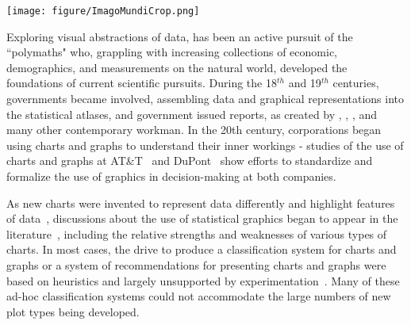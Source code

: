 \documentclass[letterpaper]{ar-1col}\usepackage[]{graphicx}\usepackage[]{color}
\begin{document}
\begin{minipage}{.35\textwidth}
\texttt{[image: figure/ImagoMundiCrop.png]}
\end{minipage}\hfill
\begin{minipage}{.6\textwidth}
\label{fig:imagomundi}
\end{minipage}
Exploring visual abstractions of data, has been an active pursuit of the ``polymaths" who, grappling with increasing collections of economic, demographics, and measurements on the natural world, developed the foundations of current scientific pursuits. During the 18$^{th}$ and 19$^{th}$ centuries, governments became involved, assembling data and graphical representations into the statistical atlases, and government issued reports, as created by \citet{Crome}, \citet{playfair1801statistical}, \citet{atlas}, and many other contemporary workman. In the 20th century, corporations began using charts and graphs to understand their inner workings - studies of the use of charts and graphs at AT\&T~\citep{chandarGraphStandardizationManagement2012} and DuPont~\citep{yatesGraphsManagerialTool1985a} show efforts to standardize and formalize the use of graphics in decision-making at both companies.

As new charts were invented to represent data differently and highlight features of data~\citep{bernsteinGraphicPresentationTrend1937,yatesGraphsManagerialTool1985a,mcdonaldFlorenceNightingaleStatistics2014}, discussions about the use of statistical graphics began to appear in the literature~\citep{peuchet1805statistique,brinton1917graphic,karsten1923charts}, including the relative strengths and weaknesses of various types of charts. In most cases, the drive to produce a classification system for charts and graphs or a system of recommendations for presenting charts and graphs were  based on heuristics and largely unsupported by experimentation~\citep{kruskalVisionsMapsGraphs1977,macdonald-rossHowNumbersAre1977}. Many of these ad-hoc classification systems could not accommodate the large numbers of new plot types being developed.
\end{document}
